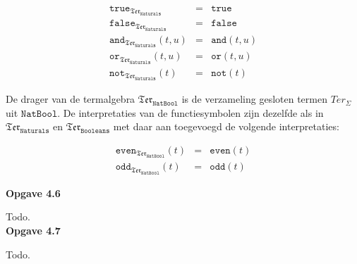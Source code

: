 \documentclass[a4paper,11pt]{article}
\begin{document}
\begin{eqnarray*}
  \texttt{true}_{\mathfrak{Ter}_{\texttt{Naturals}}}     & = & \texttt{true} \\
  \texttt{false}_{\mathfrak{Ter}_{\texttt{Naturals}}}    & = & \texttt{false} \\
  \texttt{and}_{\mathfrak{Ter}_{\texttt{Naturals}}}(t,u) & = & \texttt{and}(t,u) \\
  \texttt{or}_{\mathfrak{Ter}_{\texttt{Naturals}}}(t,u)  & = & \texttt{or}(t,u) \\
  \texttt{not}_{\mathfrak{Ter}_{\texttt{Naturals}}}(t)   & = & \texttt{not}(t)
\end{eqnarray*}

De drager van de termalgebra $\mathfrak{Ter}_{\texttt{NatBool}}$ is de
verzameling gesloten termen $Ter_{\Sigma}$ uit $\texttt{NatBool}$. De
interpretaties van de functiesymbolen zijn dezelfde als in
$\mathfrak{Ter}_{\texttt{Naturals}}$ en $\mathfrak{Ter}_{\texttt{Booleans}}$
met daar aan toegevoegd de volgende interpretaties:

\begin{eqnarray*}
  \texttt{even}_{\mathfrak{Ter}_{\texttt{NatBool}}}(t)   & = & \texttt{even}(t) \\
  \texttt{odd}_{\mathfrak{Ter}_{\texttt{NatBool}}}(t)   & = & \texttt{odd}(t)
\end{eqnarray*}


{\bf Opgave 4.6}

Todo.\\[2em]


{\bf Opgave 4.7}

Todo.\\[2em]
\end{document}
